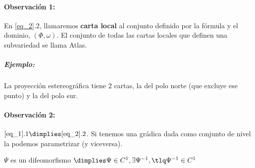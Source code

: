  \paragraph{Observación 1:} En \ref{eq_2}.2, llamaremos \textbf{carta local} al conjunto definido por la fórmula y el dominio, $(\Phi,\omega)$. El conjunto de todas las cartas locales que definen una subvariedad se llama Atlas.
 
 \subparagraph{Ejemplo:} 
 
 La proyección estereográfica tiene 2 cartas, la del polo norte (que excluye ese punto) y la del polo sur.
 
 \paragraph{Observación 2:} $\ref{eq_1}.1 \dimplies \ref{eq_2}.2$. Si tenemos una grádica dada como conjunto de nivel la podemos parametrizar (y viceversa).
 
\begin{defn}[Difeomorfismo]
$\Psi$ es un difeomorfismo $\dimplies \Psi\in C^1,\exists \Psi^{-1}, \tlq \Psi^{-1}\in C^1$
\end{defn}
 


